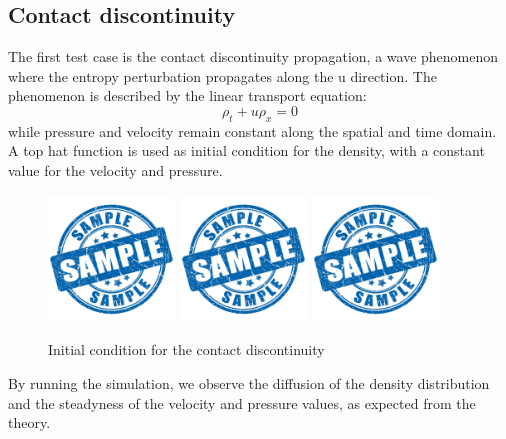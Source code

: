 \documentclass{report}
\begin{document}
\subsection*{Contact discontinuity}
The first test case is the contact discontinuity propagation, a wave phenomenon where the entropy perturbation propagates along the u direction.
The phenomenon is described by the linear transport equation:
\begin{equation*}
    \rho_t + u \rho_x = 0
\end{equation*}
while pressure and velocity remain constant along the spatial and time domain.\\
A top hat function is used as initial condition for the density, with a constant value for the velocity and pressure.
\begin{figure}[H]
    \centering
    \includegraphics[width=0.3\textwidth]{Images/sample.jpg}
    \includegraphics[width=0.3\textwidth]{Images/sample.jpg}
    \includegraphics[width=0.3\textwidth]{Images/sample.jpg}
    \caption{Initial condition for the contact discontinuity}
    \label{fig:contact_discontinuity}
\end{figure}
By running the simulation, we observe the diffusion of the density distribution and the steadyness of the velocity and pressure values, as expected from the theory.
\end{document}
